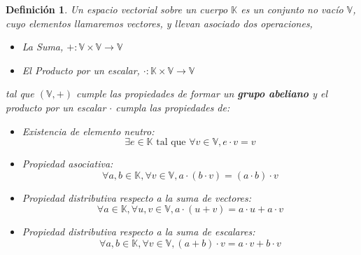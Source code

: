 \documentclass[a4paper]{article}
\newtheorem{deff}{Definición}[section]
\numberwithin{equation}{section}
\begin{document}
\begin{deff}

Un espacio vectorial sobre un cuerpo $\mathbb{K}$ es un conjunto no vacío $\mathbb{V}$, cuyo elementos llamaremos vectores, y llevan asociado dos operaciones, 
\begin{itemize}

\item La Suma, $\textbf{+}: \mathbb{V} \times \mathbb{V} \longrightarrow \mathbb{V}$

\item El Producto por un escalar, $\textbf{$\cdot$}:\mathbb{K} \times \mathbb{V} \longrightarrow \mathbb{V}$

\end{itemize}
tal que $(\mathbb{V},+)$ cumple las propiedades de formar un \textbf{grupo abeliano} y el producto por un escalar $\cdot$ cumpla las propiedades de:
\begin{itemize}

\item Existencia de elemento neutro:
\begin{equation}
\exists e \in \mathbb{K} \text{ tal que } \forall v \in \mathbb{V},  e \cdot v = v
\end{equation}

\item Propiedad asociativa:
\begin{equation}
\forall a, b \in \mathbb{K}, \forall v \in \mathbb{V}, a\cdot(b\cdot v) = (a\cdot b)\cdot v
\end{equation}

\item Propiedad distributiva respecto a la suma de vectores:
\begin{equation}
\forall a \in \mathbb{K}, \forall u, v \in \mathbb{V}, a\cdot(u + v) = a\cdot u + a\cdot v
\end{equation}

\item Propiedad distributiva respecto a la suma de escalares:
\begin{equation}
\forall a, b \in \mathbb{K}, \forall v \in \mathbb{V}, (a + b)\cdot v = a\cdot v + b\cdot v
\end{equation}

\end{itemize}

\end{deff}
\end{document}
